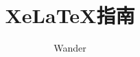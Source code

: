 \documentclass[12pt,oneside]{book}
\begin{document}
\title{XeLaTeX指南}
\author{Wander}

\makemytitle
\end{document}
